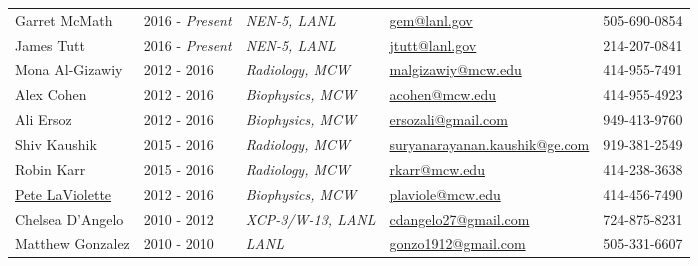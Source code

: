 
\begin{center}
\begin{minipage}{\textwidth}
\begin{tabular}{p{3.2cm}p{2.2cm}p{3.3cm}p{5.0cm}p{2.4cm}}

Garret McMath & 2016 - \emph{Present} & \textit{NEN-5, LANL} & \href{mailto:gem@lanl.gov}{gem@lanl.gov}     & 505-690-0854 \\
James Tutt    & 2016 - \emph{Present} & \textit{NEN-5, LANL} & \href{mailto:jtutt@lanl.gov}{jtutt@lanl.gov} & 214-207-0841 \\
Mona Al-Gizawiy & 2012 - 2016         & \textit{Radiology, MCW} &  \href{mailto:malgizawiy@mcw.edu}{malgizawiy@mcw.edu} & 414-955-7491 \\
Alex Cohen & 2012 - 2016 & \textit{Biophysics, MCW} &  \href{mailto:acohen@mcw.edu}{acohen@mcw.edu} & 414-955-4923 \\
Ali Ersoz & 2012 - 2016 & \textit{Biophysics, MCW} &  \href{mailto:ersozali@gmail.com}{ersozali@gmail.com} & 949-413-9760 \\
Shiv Kaushik & 2015 - 2016 & \textit{Radiology, MCW} &  \href{mailto:suryanarayanan.kaushik@ge.com}{suryanarayanan.kaushik@ge.com} & 919-381-2549 \\ %
Robin Karr   & 2015 - 2016 & \textit{Radiology, MCW} &  \href{mailto:rkarr@mcw.edu}{rkarr@mcw.edu} & 414-238-3638 \\ %

\href{http://www.mcw.edu/radiology/faculty/PeterLaViolette.htm}{Pete LaViolette} & 2012 - 2016 & \textit{Biophysics, MCW} &  \href{mailto:plaviole@mcw.edu}{plaviole@mcw.edu} & 414-456-7490 \\ %

{Chelsea D'Angelo}\label{chelsea_dangelo} & {2010 - 2012} & \textit{XCP-3/W-13, LANL}& \href{mailto:cdangelo27@gmail.com}{cdangelo27@gmail.com} & 724-875-8231\\ %

{Matthew Gonzalez}\label{matt_gonzo} & {2010 -  2010} & {\textit{LANL}} & \href{mailto:gonzo1912@gmail.com}{gonzo1912@gmail.com} & 505-331-6607\\ %

\end{tabular}
\end{minipage}
\end{center}

